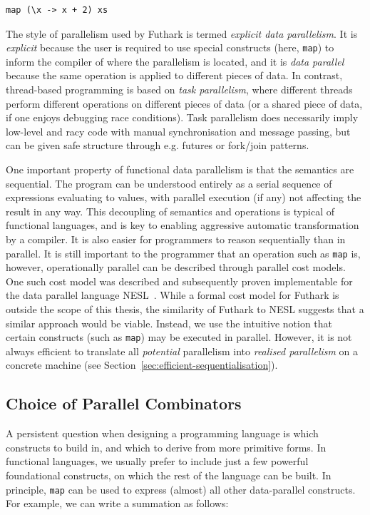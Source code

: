 \begin{lstlisting}
map (\x -> x + 2) xs
\end{lstlisting}

The style of parallelism used by Futhark is termed \textit{explicit
  data parallelism}.  It is \textit{explicit} because the user is
required to use special constructs (here, \lstinline{map}) to inform
the compiler of where the parallelism is located, and it is
\textit{data parallel} because the same operation is applied to
different pieces of data.  In contrast, thread-based programming is
based on \textit{task parallelism}, where different threads perform
different operations on different pieces of data (or a shared piece of
data, if one enjoys debugging race conditions).  Task parallelism does
necessarily imply low-level and racy code with manual synchronisation
and message passing, but can be given safe structure through
e.g. futures or fork/join patterns.

One important property of functional data parallelism is that the
semantics are sequential.  The program can be understood entirely as a
serial sequence of expressions evaluating to values, with parallel
execution (if any) not affecting the result in any way.  This
decoupling of semantics and operations is typical of functional
languages, and is key to enabling aggressive automatic transformation
by a compiler.  It is also easier for programmers to reason
sequentially than in parallel.  It is still important to the
programmer that an operation such as \lstinline{map} is, however,
operationally parallel can be described through parallel cost models.
One such cost model was described and subsequently proven
implementable for the data parallel language
NESL~\cite{Blelloch:1996:PTS:232627.232650}.  While a formal cost
model for Futhark is outside the scope of this thesis, the similarity
of Futhark to NESL suggests that a similar approach would be viable.
Instead, we use the intuitive notion that certain constructs (such as
\lstinline{map}) may be executed in parallel.  However, it is not
always efficient to translate all \textit{potential} parallelism into
\textit{realised parallelism} on a concrete machine (see
Section~\ref{sec:efficient-sequentialisation}).

\subsection{Choice of Parallel Combinators}
\label{sec:choice-of-parallel-combinators}

A persistent question when designing a programming language is which
constructs to build in, and which to derive from more primitive forms.
In functional languages, we usually prefer to include just a few
powerful foundational constructs, on which the rest of the language
can be built.  In principle, \lstinline{map} can be used to express
(almost) all other data-parallel constructs.  For example, we can
write a summation as follows:

